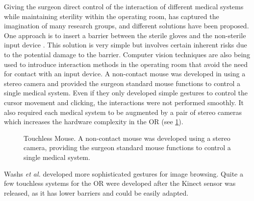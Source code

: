 Giving the surgeon direct control of the interaction of different medical systems while maintaining sterility within the operating room, has captured the imagination of many research groups, and different solutions have been proposed. 
One approach is to insert a barrier between the sterile gloves and the non-sterile input device \cite{Ionescu2006}. This solution is very simple but involves certain inherent risks due to the potential damage to the barrier. Computer vision techniques are also being used to introduce interaction methods in the operating room that avoid the need for contact with an input device.
A non-contact mouse was developed in \cite{Gratzel2004a} using a stereo camera and provided the surgeon standard mouse functions to control a single medical system. Even if they only developed simple gestures to control the cursor movement and clicking, the interactions were not performed smoothly. It also required each medical system to be augmented by a pair of stereo cameras which increases the hardware complexity in the OR (see \figurename{\ref{fig:2-bg:touchlessMouse}}). 
\begin{figure}
	\centering
	\qquad
	\caption{Touchless Mouse. A non-contact mouse was developed using a stereo camera, providing the surgeon standard mouse functions to control a single medical system.}
	\label{fig:2-bg:touchlessMouse}
\end{figure}
Washs \textit{et al.} \cite{Wachs2008} developed more sophisticated gestures for image browsing.
Quite a few touchless systems \cite{Strickland2013,Ebert2013,Tan2013} for the OR were developed after the Kinect sensor was released, as it has lower barriers and could be easily adapted.
